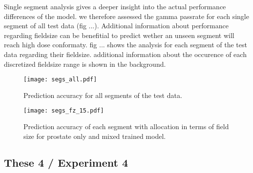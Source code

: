 Single segment analysis gives a deeper insight into the actual performance differences of the model. we therefore assessed the gamma passrate for each single segment of all test data (fig ...). Additional information about performance regarding fieldsize can be benefitial to predict wether an unseen segment will reach high dose conformaty. fig ... shows the analysis for each segment of the test data regarding their fieldsize. additional information about the occurence of each discretized fieldsize range is shown in the background. 

\begin{figure}
    \centering
    \texttt{[image: segs\_all.pdf]}
    \caption{Prediction accuracy for all segments of the test data.}\label{fig:all_test}
\end{figure}

\begin{figure}
    \centering
    \texttt{[image: segs\_fz\_15.pdf]}
    \caption{Prediction accuracy of each segment with allocation in terms of field size for prostate only and mixed trained model.}\label{fig:fz_test}
\end{figure}

\subsection{These 4 / Experiment 4}